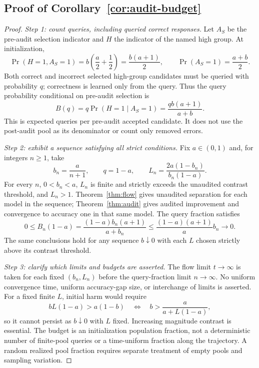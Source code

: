 \subsection{Proof of Corollary~\ref{cor:audit-budget}}
\begin{proof}
\textit{Step 1: count queries, including queried correct responses.}
Let $A_S$ be the pre-audit selection indicator and $H$ the indicator of
the named high group. At initialization,
\[
 \Pr(H=1,A_S=1)
 =b\left(\frac a2+\frac12\right)=\frac{b(a+1)}2,
 \qquad \Pr(A_S=1)=\frac{a+b}{2}.
\]
Both correct and incorrect selected high-group candidates must be queried
with probability $q$; correctness is learned only from the query. Thus
the query probability conditional on pre-audit selection is
\[
 B(q)=q\Pr(H=1\mid A_S=1)=\frac{qb(a+1)}{a+b}.
\]
This is expected queries per pre-audit accepted candidate. It does not
use the post-audit pool as its denominator or count only removed errors.

\textit{Step 2: exhibit a sequence satisfying all strict conditions.}
Fix $a\in(0,1)$ and, for integers $n\geq1$, take
\[
 b_n=\frac{a}{n+1},\qquad q=1-a,\qquad
 L_n=\frac{2a(1-b_n)}{b_n(1-a)}.
\]
For every $n$, $0<b_n<a$, $L_n$ is finite and strictly exceeds the
unaudited contrast threshold, and $L_n>1$. Theorem~\ref{thm:flow} gives
unaudited separation for each model in the sequence; Theorem~\ref{thm:audit}
gives audited improvement and convergence to accuracy one in that same
model. The query fraction satisfies
\[
 0\leq B_n(1-a)=\frac{(1-a)b_n(a+1)}{a+b_n}
 \leq\frac{(1-a)(a+1)}a b_n\longrightarrow0.
\]
The same conclusions hold for any sequence $b\downarrow0$ with each
$L$ chosen strictly above its contrast threshold.

\textit{Step 3: clarify which limits and budgets are asserted.}
The flow limit $t\to\infty$ is taken for each fixed $(b_n,L_n)$ before
the query-fraction limit $n\to\infty$. No uniform convergence time,
uniform accuracy-gap size, or interchange of limits is asserted.
For a fixed finite $L$, initial harm would require
\[
 bL(1-a)>a(1-b)
 \quad\Longleftrightarrow\quad
 b>\frac{a}{a+L(1-a)},
\]
so it cannot persist as $b\downarrow0$ with $L$ fixed. Increasing magnitude
contrast is essential. The budget is an initialization population fraction,
not a deterministic number of finite-pool queries or a time-uniform fraction
along the trajectory. A random realized pool fraction requires separate
treatment of empty pools and sampling variation.
\end{proof}

